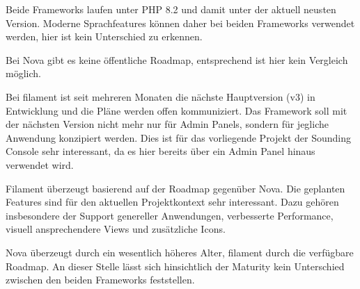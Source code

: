 Beide Frameworks laufen unter PHP 8.2 und damit unter der aktuell neusten Version.
Moderne Sprachfeatures können daher bei beiden Frameworks verwendet werden, hier ist kein Unterschied zu erkennen.

Bei Nova gibt es keine öffentliche Roadmap, entsprechend ist hier kein Vergleich möglich.

Bei filament ist seit mehreren Monaten die nächste Hauptversion (v3) in Entwicklung\cite{filament-v3-plans} und die Pläne werden offen kommuniziert.
Das Framework soll mit der nächsten Version nicht mehr nur für Admin Panels, sondern für jegliche Anwendung konzipiert werden\cite{filament-v3}.
Dies ist für das vorliegende Projekt der Sounding Console sehr interessant, da es hier bereits über ein Admin Panel hinaus verwendet wird.

Filament überzeugt basierend auf der Roadmap gegenüber Nova.
Die geplanten Features sind für den aktuellen Projektkontext sehr interessant.
Dazu gehören insbesondere der Support genereller Anwendungen, verbesserte Performance, visuell ansprechendere Views und zusätzliche Icons.

Nova überzeugt durch ein wesentlich höheres Alter, filament durch die verfügbare Roadmap.
An dieser Stelle lässt sich hinsichtlich der Maturity kein Unterschied zwischen den beiden Frameworks feststellen.
